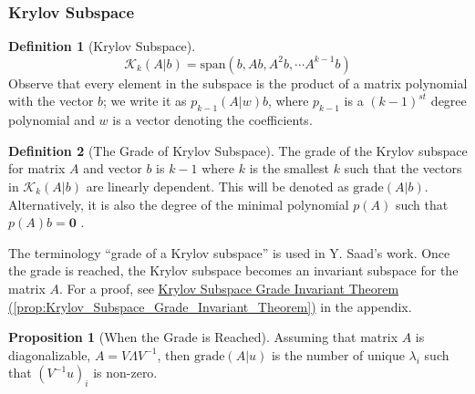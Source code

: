 \documentclass[]{article}
\theoremstyle{definition}
\newtheorem{prop}{Proposition}[section]  %
\newtheorem{definition}{Definition}      %
\begin{document}
        \subsubsection{Krylov Subspace}
            \begin{definition}[Krylov Subspace]
                $$
                \mathcal{K}_k(A|b) = \text{span}( b, Ab, A^2b, \cdots A^{k - 1}b)
                $$
                Observe that every element in the subspace is the product of a matrix polynomial with the vector $b$; we write it as $p_{k-1}(A|w)b$, where $p_{k-1}$ is a $(k-1 )^{st}$ degree  polynomial and $w$ is a vector denoting the coefficients. 
            \end{definition}
            \begin{definition}[The Grade of Krylov Subspace]
                The grade of the Krylov subspace for matrix $A$ and vector $b$ is $k - 1$ where $k$ is the smallest $k$ such that the vectors in $\mathcal K_{k}(A|b)$ are linearly dependent.  This will be denoted as $\text{grade}(A|b)$. Alternatively, it is also the degree of the minimal polynomial $p(A)$ such that $p(A)b= \mathbf 0$ .
            \end{definition}
            The terminology ``grade of a Krylov subspace'' is used in Y. Saad's work\cite{book:saad_sparse_linear}.
            Once the grade is reached, the Krylov subspace becomes an invariant subspace for the matrix $A$. For a proof, see \hyperref[prop:Krylov_Subspace_Grade_Invariant_Theorem]{Krylov Subspace Grade Invariant Theorem (\ref*{prop:Krylov_Subspace_Grade_Invariant_Theorem})} in the appendix. 
            \begin{prop}[When the Grade is Reached]\label{prop:When_the_Grade_is_Reached}
                Assuming that matrix $A$ is diagonalizable, $A = V\Lambda V^{-1}$, then $\text{grade}(A|u)$ is the number of unique $\lambda_i$ such that $(V^{-1}u)_i$ is non-zero. 
            \end{prop}
\end{document}
